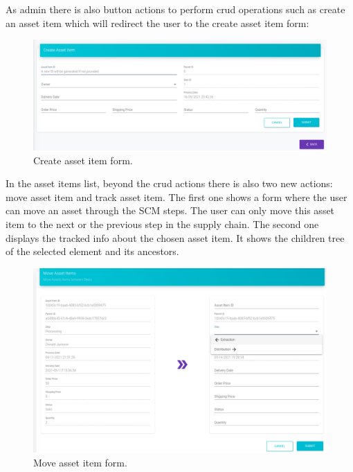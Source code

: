 As admin there is also button actions to perform crud operations such as create an asset item which will redirect the user to the create asset item form: 

\begin{figure}[H]
\begin{center}
  \includegraphics[scale=0.34]{images/use_example/09_create_asset_Item.png}
\caption{Create asset item form.}
\label{fig:create_asset_item}
\end{center}
\end{figure}


In the asset items list, beyond the crud actions there is also two new actions: move asset item and track asset item. The first one shows a form where the user can move an asset through the SCM steps. The user can only move this asset item to the next or the previous step in the supply chain. The second one displays the tracked info about the chosen asset item. It shows the children tree of the selected element and its ancestors.

\begin{figure}[H]
\begin{center}
  \includegraphics[scale=0.32]{images/use_example/091_move_asset_Item.png}
\caption{Move asset item form.}
\label{fig:move_asset_item}
\end{center}
\end{figure}

